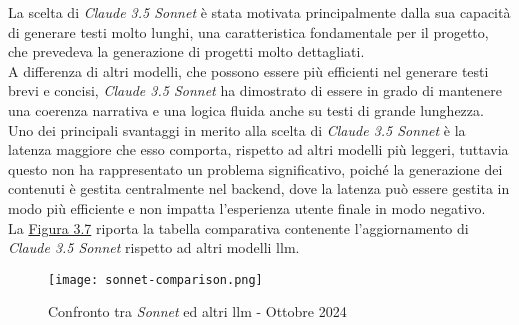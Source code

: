 \noindent La scelta di \textit{Claude 3.5 Sonnet} è stata motivata principalmente dalla sua capacità di generare testi molto lunghi, una caratteristica fondamentale per il progetto, che prevedeva la generazione di progetti molto dettagliati.\\
A differenza di altri modelli, che possono essere più efficienti nel generare testi brevi e concisi, \textit{Claude 3.5 Sonnet} ha dimostrato di essere in grado di mantenere una coerenza narrativa e una logica fluida anche su testi di grande lunghezza.\\

\noindent Uno dei principali svantaggi in merito alla scelta di \textit{Claude 3.5 Sonnet} è la latenza maggiore che esso comporta, rispetto ad altri modelli più leggeri,
tuttavia questo non ha rappresentato un problema significativo, poiché la generazione dei contenuti è gestita centralmente nel \gls{backend}, dove la latenza può essere gestita in modo più efficiente e non impatta l'esperienza utente finale in modo negativo.\\

\noindent La {\hyperref[fig:sonnet-comparison]{Figura 3.7}} riporta la tabella comparativa contenente l'aggiornamento di \textit{Claude 3.5 Sonnet} rispetto ad altri modelli \gls{llm}.

\begin{figure}[H]
    \centering
    \texttt{[image: sonnet-comparison.png]}
    \caption{Confronto tra \textit{Sonnet} ed altri \gls{llm} - Ottobre 2024}
    \cite{site:updated-sonnet}
    \label{fig:sonnet-comparison}
\end{figure}
